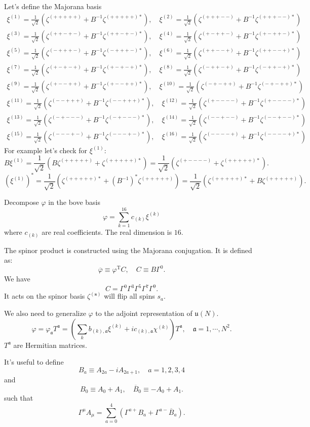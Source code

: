 Let's define the Majorana basis
\begin{align*}
	\xi^{(1)} = \frac{1}{\sqrt{2}} (\zeta^{(+++++)} + B^{-1}\zeta^{(+++++)*}),\quad
	\xi^{(2)} = \frac{1}{\sqrt{2}} (\zeta^{(+++--)} + B^{-1}\zeta^{(+++--)*})
	\\
	\xi^{(3)} = \frac{1}{\sqrt{2}} (\zeta^{(++-+-)} + B^{-1}\zeta^{(++-+-)*}),\quad
	\xi^{(4)} = \frac{1}{\sqrt{2}} (\zeta^{(+-++-)} + B^{-1}\zeta^{(+-++-)*})
	\\
	\xi^{(5)} = \frac{1}{\sqrt{2}} (\zeta^{(-+++-)} + B^{-1}\zeta^{(-+++-)*}),\quad
	\xi^{(6)} = \frac{1}{\sqrt{2}} (\zeta^{(++--+)} + B^{-1}\zeta^{(++--+)*})
	\\
	\xi^{(7)} = \frac{1}{\sqrt{2}} (\zeta^{(+-+-+)} + B^{-1}\zeta^{(+-+-+)*}),\quad
	\xi^{(8)} = \frac{1}{\sqrt{2}} (\zeta^{(-++-+)} + B^{-1}\zeta^{(-++-+)*})
	\\
	\xi^{(9)} = \frac{1}{\sqrt{2}} (\zeta^{(+--++)} + B^{-1}\zeta^{(+--++)*}),\quad
	\xi^{(10)} = \frac{1}{\sqrt{2}} (\zeta^{(-+-++)} + B^{-1}\zeta^{(-+-++)*})
	\\
	\xi^{(11)} = \frac{1}{\sqrt{2}} (\zeta^{(--+++)} + B^{-1}\zeta^{(--+++)*}),\quad
	\xi^{(12)} = \frac{1}{\sqrt{2}} (\zeta^{(+----)} + B^{-1}\zeta^{(+----)*})
	\\
	\xi^{(13)} = \frac{1}{\sqrt{2}} (\zeta^{(-+---)} + B^{-1}\zeta^{(-+---)*}),\quad
	\xi^{(14)} = \frac{1}{\sqrt{2}} (\zeta^{(--+--)} + B^{-1}\zeta^{(--+--)*})
	\\
	\xi^{(15)} = \frac{1}{\sqrt{2}} (\zeta^{(---+-)} + B^{-1}\zeta^{(---+-)*}),\quad
	\xi^{(16)} = \frac{1}{\sqrt{2}} (\zeta^{(----+)} + B^{-1}\zeta^{(----+)*})
\end{align*}
For example let's check for $\xi^{(1)}$:
\[
	B \xi^{(1)} = \frac{1}{\sqrt{2}} 
	(B \zeta^{(+++++)} + \zeta^{(+++++)*})
	= \frac{1}{\sqrt{2}}
	(\zeta^{(+----)} + \zeta^{(+++++)*})
.\] 
\[
	(\xi^{(1)})^* = \frac{1}{\sqrt{2}}
	(\zeta^{(+++++)*} + (B^{-1})^* \zeta^{(+++++)})
	= \frac{1}{\sqrt{2}}
	(\zeta^{(+++++)*} + B \zeta^{(+++++)})
.\] 

Decompose $\varphi$ in the bove basis
\[
	\varphi = \sum_{k=1}^{16} c_{(k)} \xi^{(k)} 
\] 
where $c_{(k)}$ are real coefficients.
The real dimension is $16$.

The spinor product is constructed using the Majorana conjugation. 
It is defined as:
\[
	\overline{\varphi} \equiv \varphi^{\text{T}} C,\quad C\equiv B \Gamma^0
.\] 
We have
\[
C = \Gamma^0 \Gamma^3 \Gamma^5 \Gamma^7 \Gamma^9
.\] 
It acts on the spinor basis $\zeta^{(\mathbf{s})}$ will flip all spins $s_a$.

We also need to generalize $\varphi$ to the adjoint representation of $\mathfrak{u}(N)$.
\[
	\varphi = \varphi_{\mathfrak{a}} T^{\mathfrak{a}}
	= \left( \sum_{k} b_{(k),\mathfrak{a}} \xi^{(k)} + i c_{(k),\mathfrak{a}} \chi^{(k)}\right) T^{\mathfrak{a}},\quad \mathfrak{a} = 1,\cdots,N^2
.\] 
$T^{\mathfrak{a}}$ are Hermitian matrices.

It's useful to define
\[
B_a \equiv A_{2a} - i A_{2a+1},\quad a=1,2,3,4
\] 
and
\[
B_0 \equiv A_0 + A_1,\quad \overline{B}_0 \equiv -A_0 + A_1
.\] 
such that
\[
\Gamma^\mu A_\mu = \sum_{a=0}^4 (\Gamma^{a+}B_a + \Gamma^{a-}\overline{B}_a)
.\] 
